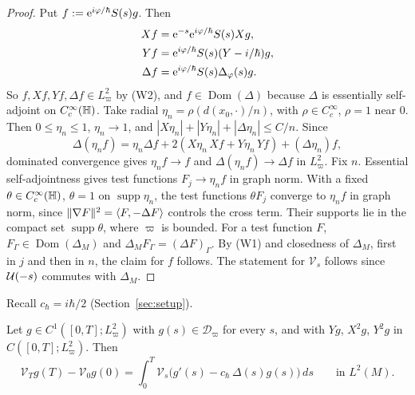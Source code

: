 \begin{proof}
Put $f:=\mathrm{e}^{i\varphi/\hbar}S(s)g$. Then
\[
\begin{aligned}
Xf&=\mathrm{e}^{-s}\mathrm{e}^{i\varphi/\hbar}S(s)Xg,\\
Yf&=\mathrm{e}^{i\varphi/\hbar}S(s)(Y-i/\hbar)g,\\
\Delta f&=\mathrm{e}^{i\varphi/\hbar}S(s)\Delta_\varphi(s)g.
\end{aligned}
\]
So $f,Xf,Yf,\Delta f\in L^2_\varpi$ by (W2), and $f\in\operatorname{Dom}(\Delta)$ because $\Delta$ is essentially self-adjoint on $C_c^\infty(\mathbb{H})$.
Take radial $\eta_n=\rho(d(x_0,\cdot)/n)$, with $\rho\in C_c^\infty$, $\rho=1$ near $0$. Then $0\le\eta_n\le1$, $\eta_n\to1$, and $|X\eta_n|+|Y\eta_n|+|\Delta\eta_n|\le C/n$. Since
\[\Delta(\eta_nf)=\eta_n\Delta f+2(X\eta_n\,Xf+Y\eta_n\,Yf)+(\Delta\eta_n)f,\]
dominated convergence gives $\eta_nf\to f$ and $\Delta(\eta_nf)\to\Delta f$ in $L^2_\varpi$.
Fix $n$. Essential self-adjointness gives test functions $F_j\to\eta_nf$ in graph norm. With a fixed $\theta\in C_c^\infty(\mathbb{H})$, $\theta=1$ on $\operatorname{supp}\eta_n$, the test functions $\theta F_j$ converge to $\eta_nf$ in graph norm, since $\lVert \nabla F\rVert^2=\langle F,-\Delta F\rangle$ controls the cross term. Their supports lie in the compact set $\operatorname{supp}\theta$, where $\varpi$ is bounded.
For a test function $F$, $F_\Gamma\in\operatorname{Dom}(\Delta_M)$ and $\Delta_MF_\Gamma=(\Delta F)_\Gamma$. By (W1) and closedness of $\Delta_M$, first in $j$ and then in $n$, the claim for $f$ follows. The statement for $\mathcal V_s$ follows since $\mathcal{U}(-s)$ commutes with $\Delta_M$.\qedhere
\end{proof}

Recall $c_\hbar=i\hbar/2$ (Section~\ref{sec:setup}).

\begin{lemma}[Duhamel on $M$]\label{lem:surf-duh}
Let $g\in C^1([0,T];L^2_\varpi)$ with $g(s)\in\mathcal D_\varpi$ for every $s$, and with $Yg$, $X^2g$, $Y^2g$ in
$C([0,T];L^2_\varpi)$. Then
\[
\mathcal V_Tg(T)-\mathcal V_0g(0)=\int_0^T\mathcal V_s\bigl(g'(s)-c_\hbar\,\Delta(s)g(s)\bigr)\,ds\qquad\text{in }L^2(M).
\]
\end{lemma}

